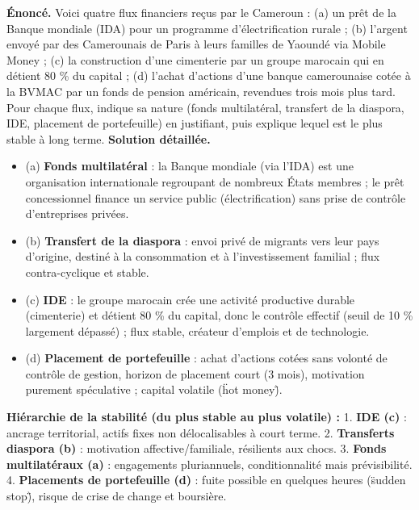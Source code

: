\documentclass[11pt]{article}
\begin{document}
\begin{exoresolu}
\textbf{Énoncé.} Voici quatre flux financiers reçus par le Cameroun : (a) un prêt de la Banque mondiale (IDA) pour un programme d'électrification rurale ; (b) l'argent envoyé par des Camerounais de Paris à leurs familles de Yaoundé via Mobile Money ; (c) la construction d'une cimenterie par un groupe marocain qui en détient 80 \% du capital ; (d) l'achat d'actions d'une banque camerounaise cotée à la BVMAC par un fonds de pension américain, revendues trois mois plus tard. Pour chaque flux, indique sa nature (fonds multilatéral, transfert de la diaspora, IDE, placement de portefeuille) en justifiant, puis explique lequel est le plus stable à long terme.
\tcblower
\textbf{Solution détaillée.}
\begin{itemize}
\item (a) \textbf{Fonds multilatéral} : la Banque mondiale (via l'IDA) est une organisation internationale regroupant de nombreux États membres ; le prêt concessionnel finance un service public (électrification) sans prise de contrôle d'entreprises privées.
\item (b) \textbf{Transfert de la diaspora} : envoi privé de migrants vers leur pays d'origine, destiné à la consommation et à l'investissement familial ; flux contra-cyclique et stable.
\item (c) \textbf{IDE} : le groupe marocain crée une activité productive durable (cimenterie) et détient 80 \% du capital, donc le contrôle effectif (seuil de 10 \% largement dépassé) ; flux stable, créateur d'emplois et de technologie.
\item (d) \textbf{Placement de portefeuille} : achat d'actions cotées sans volonté de contrôle de gestion, horizon de placement court (3 mois), motivation purement spéculative ; capital volatile (\"hot money\").
\end{itemize}
\textbf{Hiérarchie de la stabilité (du plus stable au plus volatile) :}
1. \textbf{IDE (c)} : ancrage territorial, actifs fixes non délocalisables à court terme.
2. \textbf{Transferts diaspora (b)} : motivation affective/familiale, résilients aux chocs.
3. \textbf{Fonds multilatéraux (a)} : engagements pluriannuels, conditionnalité mais prévisibilité.
4. \textbf{Placements de portefeuille (d)} : fuite possible en quelques heures (\"sudden stop\"), risque de crise de change et boursière.
\end{exoresolu}
\end{document}
